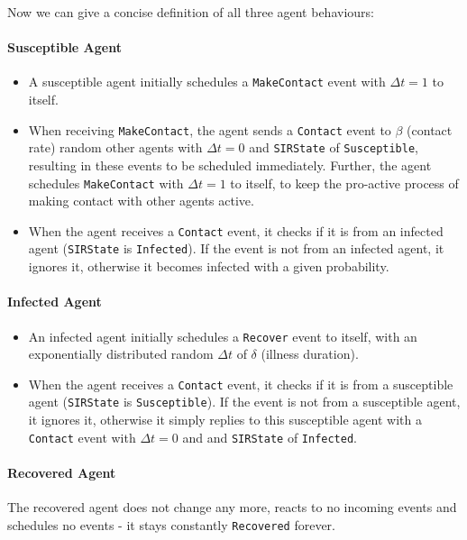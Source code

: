 Now we can give a concise definition of all three agent behaviours:

\paragraph{Susceptible Agent}
\begin{itemize}
	\item A susceptible agent initially schedules a \texttt{MakeContact} event with $\Delta t = 1$ to itself.
	\item When receiving \texttt{MakeContact}, the agent sends a \texttt{Contact} event to $\beta$ (contact rate) random other agents with $\Delta t = 0$ and \texttt{SIRState} of \texttt{Susceptible}, resulting in these events to be scheduled immediately. Further, the agent schedules \texttt{MakeContact} with $\Delta t = 1$ to itself, to keep the pro-active process of making contact with other agents active.
	\item When the agent receives a \texttt{Contact} event, it checks if it is from an infected agent (\texttt{SIRState} is \texttt{Infected}). If the event is not from an infected agent, it ignores it, otherwise it becomes infected with a given probability.
\end{itemize}

\paragraph{Infected Agent}
\begin{itemize}
	\item An infected agent initially schedules a \texttt{Recover} event to itself, with an exponentially distributed random $\Delta t$ of $\delta$ (illness duration).
	\item When the agent receives a \texttt{Contact} event, it checks if it is from a susceptible agent (\texttt{SIRState} is \texttt{Susceptible}). If the event is not from a susceptible agent, it ignores it, otherwise it simply replies to this susceptible agent with a \texttt{Contact} event with $\Delta t = 0$ and and \texttt{SIRState} of \texttt{Infected}.
\end{itemize}

\paragraph{Recovered Agent}
The recovered agent does not change any more, reacts to no incoming events and schedules no events - it stays constantly \texttt{Recovered} forever.

